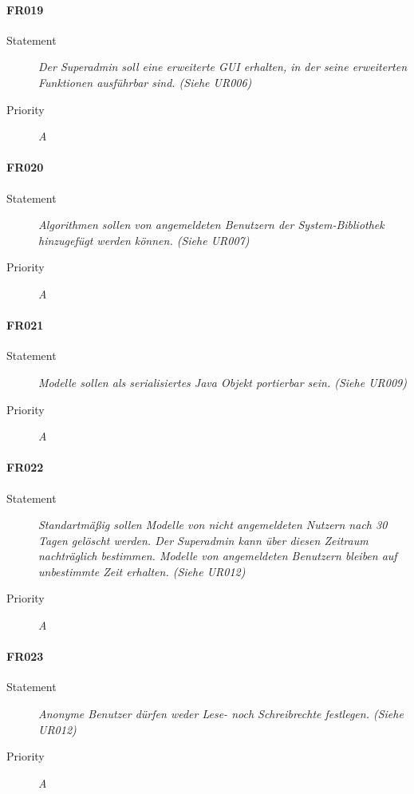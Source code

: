 \paragraph{FR019}
\begin{description}
  \item [Statement] 
    \textit{Der \gls{Superadmin} soll eine erweiterte \gls{GUI} erhalten, in der seine erweiterten Funktionen ausführbar sind.
	(Siehe UR006)}
  \item [Priority] \textit{A}
\end{description}

\paragraph{FR020}
\begin{description}
  \item [Statement] 
    \textit{Algorithmen sollen von angemeldeten Benutzern der System-Bibliothek hinzugefügt werden können.
	(Siehe UR007)}
  \item [Priority] \textit{A}
\end{description}

\paragraph{FR021}
\begin{description}
  \item [Statement] 
    \textit{Modelle sollen als serialisiertes \gls{Java} Objekt portierbar sein.
	(Siehe UR009)}
  \item [Priority] \textit{A}
\end{description}

\paragraph{FR022}
\begin{description}
  \item [Statement] 
    \textit{Standartmäßig sollen Modelle von nicht angemeldeten Nutzern nach 30 Tagen gelöscht werden. Der \gls{Superadmin} kann über diesen Zeitraum nachträglich bestimmen. Modelle von angemeldeten Benutzern bleiben auf unbestimmte Zeit erhalten.
	(Siehe UR012)}
  \item [Priority] \textit{A}
\end{description}

\paragraph{FR023}
\begin{description}
  \item [Statement] 
    \textit{Anonyme Benutzer dürfen weder Lese- noch Schreibrechte festlegen.
	(Siehe UR012)}
  \item [Priority] \textit{A}
\end{description}

